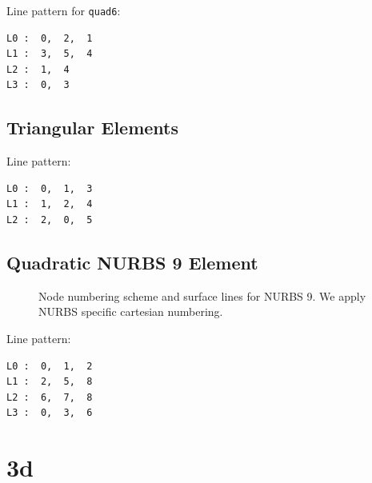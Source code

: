 Line pattern for \texttt{quad6}:
\begin{verbatim}
L0 :  0,  2,  1
L1 :  3,  5,  4
L2 :  1,  4
L3 :  0,  3
\end{verbatim}

\subsection{Triangular Elements}

Line pattern:
\begin{verbatim}
L0 :  0,  1,  3
L1 :  1,  2,  4
L2 :  2,  0,  5
\end{verbatim}

\subsection{Quadratic NURBS 9 Element}

\begin{figure}[h!]
\begin{center}
\caption{Node numbering scheme and surface lines for NURBS 9. We apply NURBS specific cartesian numbering.}
\label{fig:conventions:2d}
\end{center}
\end{figure}

Line pattern:
\begin{verbatim}
L0 :  0,  1,  2
L1 :  2,  5,  8
L2 :  6,  7,  8
L3 :  0,  3,  6
\end{verbatim}



\newpage
\section{3d}
